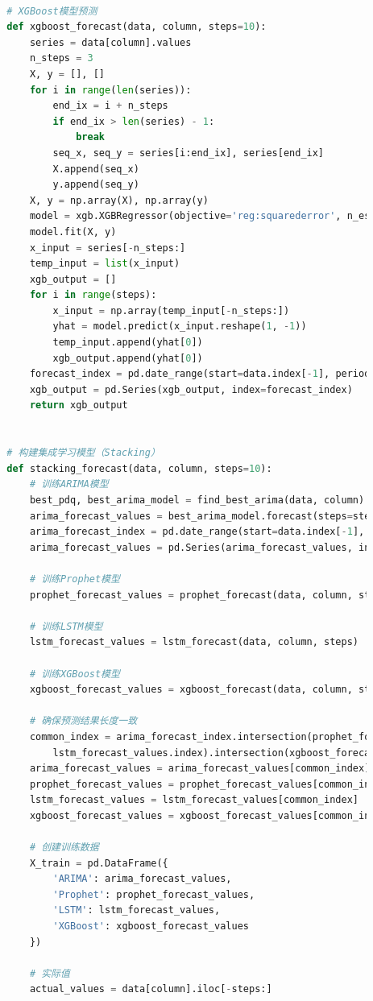 \documentclass[a4paper]{article}
\begin{document}
\begin{lstlisting}[language=Python]
		
		# XGBoost模型预测
		def xgboost_forecast(data, column, steps=10):
			series = data[column].values
			n_steps = 3
			X, y = [], []
			for i in range(len(series)):
				end_ix = i + n_steps
				if end_ix > len(series) - 1:
					break
				seq_x, seq_y = series[i:end_ix], series[end_ix]
				X.append(seq_x)
				y.append(seq_y)
			X, y = np.array(X), np.array(y)
			model = xgb.XGBRegressor(objective='reg:squarederror', n_estimators=100)
			model.fit(X, y)
			x_input = series[-n_steps:]
			temp_input = list(x_input)
			xgb_output = []
			for i in range(steps):
				x_input = np.array(temp_input[-n_steps:])
				yhat = model.predict(x_input.reshape(1, -1))
				temp_input.append(yhat[0])
				xgb_output.append(yhat[0])
			forecast_index = pd.date_range(start=data.index[-1], periods=steps + 1, freq='MS')[1:]
			xgb_output = pd.Series(xgb_output, index=forecast_index)
			return xgb_output
		
		
		# 构建集成学习模型（Stacking）
		def stacking_forecast(data, column, steps=10):
			# 训练ARIMA模型
			best_pdq, best_arima_model = find_best_arima(data, column)
			arima_forecast_values = best_arima_model.forecast(steps=steps)
			arima_forecast_index = pd.date_range(start=data.index[-1], periods=steps + 1, freq='MS')[1:]
			arima_forecast_values = pd.Series(arima_forecast_values, index=arima_forecast_index)
		
			# 训练Prophet模型
			prophet_forecast_values = prophet_forecast(data, column, steps)
		
			# 训练LSTM模型
			lstm_forecast_values = lstm_forecast(data, column, steps)
		
			# 训练XGBoost模型
			xgboost_forecast_values = xgboost_forecast(data, column, steps)
		
			# 确保预测结果长度一致
			common_index = arima_forecast_index.intersection(prophet_forecast_values.index).intersection(
				lstm_forecast_values.index).intersection(xgboost_forecast_values.index)
			arima_forecast_values = arima_forecast_values[common_index]
			prophet_forecast_values = prophet_forecast_values[common_index]
			lstm_forecast_values = lstm_forecast_values[common_index]
			xgboost_forecast_values = xgboost_forecast_values[common_index]
		
			# 创建训练数据
			X_train = pd.DataFrame({
				'ARIMA': arima_forecast_values,
				'Prophet': prophet_forecast_values,
				'LSTM': lstm_forecast_values,
				'XGBoost': xgboost_forecast_values
			})
		
			# 实际值
			actual_values = data[column].iloc[-steps:]
		

\end{lstlisting}
\end{document}
